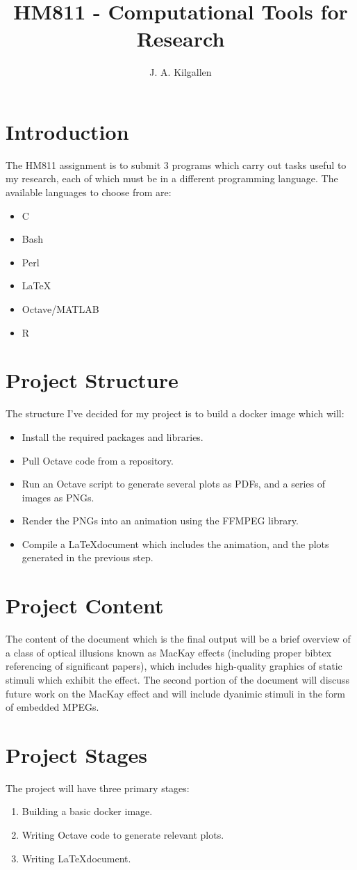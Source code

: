 \documentclass[english]{article}
\begin{document}
\title{HM811 - Computational Tools for Research}
\author{J. A. Kilgallen}
\maketitle

\section{Introduction}

The HM811 assignment is to submit 3 programs which carry out tasks
useful to my research, each of which must be in a different programming
language. The available languages to choose from are:
\begin{itemize}
\item C
\item Bash
\item Perl
\item \LaTeX
\item Octave/MATLAB
\item R
\end{itemize}

\section{Project Structure }

The structure I've decided for my project is to build a docker image
which will:
\begin{itemize}
\item Install the required packages and libraries.
\item Pull Octave code from a repository. 
\item Run an Octave script to generate several plots as PDFs, and a series
of images as PNGs.
\item Render the PNGs into an animation using the FFMPEG library.
\item Compile a \LaTeX document which includes the animation, and the plots
generated in the previous step.
\end{itemize}

\section{Project Content}

The content of the document which is the final output will be a brief
overview of a class of optical illusions known as MacKay effects (including
proper bibtex referencing of significant papers), which includes high-quality
graphics of static stimuli which exhibit the effect. The second portion
of the document will discuss future work on the MacKay effect and
will include dyanimic stimuli in the form of embedded MPEGs.

\section{Project Stages}

The project will have three primary stages:
\begin{enumerate}
\item Building a basic docker image.
\item Writing Octave code to generate relevant plots.
\item Writing \LaTeX document.
\end{enumerate}
\end{document}
